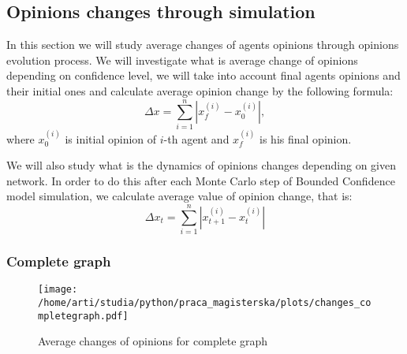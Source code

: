 \documentclass{article}
\begin{document}




\subsection{Opinions changes through simulation}
In this section we will study average changes of agents opinions through opinions evolution process. We will investigate what is average change of opinions depending on confidence level, we will take into account final agents opinions and their initial ones and calculate average opinion change by the following formula:
\begin{equation}
\Delta x = \sum_{i=1}^n \left|x_{f}^{(i)} - x_0^{(i)} \right|,
\end{equation}
where $x_0^{(i)}$ is initial opinion of $i$-th agent and $x_{f}^{(i)}$ is his final opinion.

\indent

We will also study what is the dynamics of opinions changes depending on given network. In order to do this after each Monte Carlo step of Bounded Confidence model simulation, we calculate average value of opinion change, that is:
\begin{equation}
\Delta x_t = \sum_{i=1}^n \left|x_{t+1}^{(i)} - x_{t}^{(i)} \right|
\end{equation}



\subsubsection{Complete graph}

\begin{figure}[H]
		\centering
		\texttt{[image: /home/arti/studia/python/praca\_magisterska/plots/changes\_completegraph.pdf]}
		\caption{Average changes of opinions for complete graph}
\end{figure}
\end{document}
